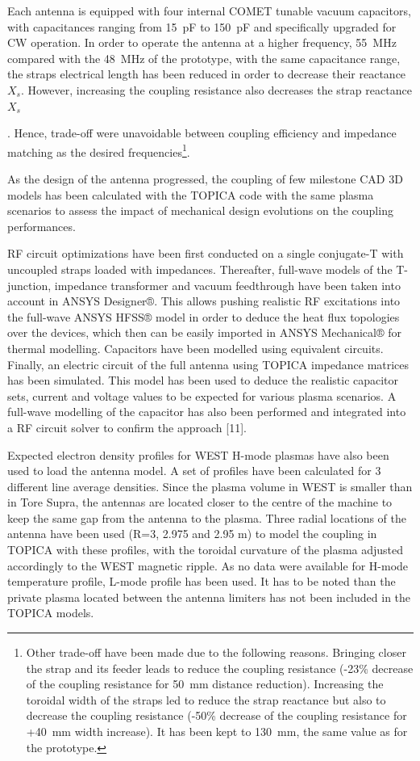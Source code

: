 Each antenna is equipped with four internal COMET tunable vacuum capacitors, with capacitances ranging from 15~pF to 150~pF and specifically upgraded for CW operation. In order to operate the antenna at a higher frequency, 55~MHz compared with the 48~MHz of the prototype, with the same capacitance range, the straps electrical length has been reduced in order to decrease their reactance $X_s$. However, increasing the coupling resistance also decreases the strap reactance $X_s$ {. Hence, trade-off were unavoidable between coupling efficiency and impedance matching as the desired frequencies\footnote{Other trade-off have been made due to the following reasons. Bringing closer the strap and its feeder leads to reduce the coupling resistance (-23\% decrease of the coupling resistance for 50~mm distance reduction). Increasing the toroidal width of the straps led to reduce the strap reactance but also to decrease the coupling resistance (-50\% decrease of the coupling resistance for +40~mm width increase). It has been kept to 130~mm, the same value as for the prototype.}. 

As the design of the antenna progressed, the coupling of few milestone CAD 3D models has been calculated with the TOPICA code  with the same plasma scenarios to assess the impact of mechanical design evolutions on the coupling performances.



RF circuit optimizations have been first conducted on a single conjugate-T with uncoupled straps loaded with impedances. Thereafter, full-wave models of the T-junction, impedance transformer and vacuum feedthrough have been taken into account in ANSYS Designer®. This allows pushing realistic RF excitations into the full-wave ANSYS HFSS® model in order to deduce the heat flux topologies over the devices, which then can be easily imported in ANSYS Mechanical® for thermal modelling. Capacitors have been modelled using equivalent circuits. Finally, an electric circuit of the full antenna using TOPICA impedance matrices has been simulated. This model has been used to deduce the realistic capacitor sets, current and voltage values to be expected for various plasma scenarios. A full-wave modelling of the capacitor has also been performed and integrated into a RF circuit solver to confirm the approach [11].

Expected electron density profiles for WEST H-mode plasmas have also been used to load the antenna model. A set of profiles have been calculated for 3 different line average densities. Since the plasma volume in WEST is smaller than in Tore Supra, the antennas are located closer to the centre of the machine to keep the same gap from the antenna to the plasma. Three radial locations of the antenna have been used (R=3, 2.975 and 2.95 m) to model the coupling in TOPICA with these profiles, with the toroidal curvature of the plasma adjusted accordingly to the WEST magnetic ripple. As no data were available for H-mode temperature profile, L-mode profile has been used. It has to be noted than the private plasma located between the antenna limiters has not been included in the TOPICA models.

}
